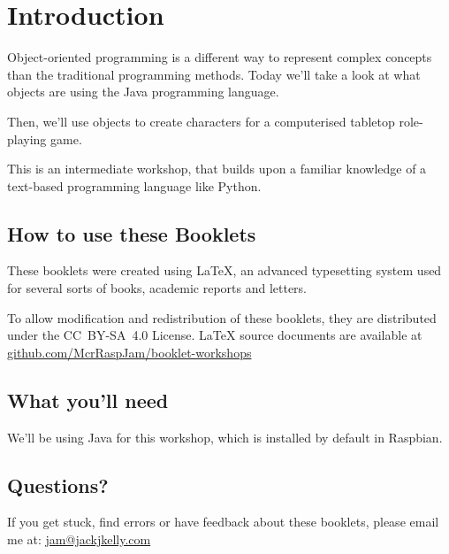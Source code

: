 \setcounter{section}{-1}
\section{Introduction}
	
	Object-oriented programming is a different way to represent complex concepts than the traditional programming methods. Today we'll take a look at what objects are using the Java programming language.
	
	Then, we'll use objects to create characters for a computerised tabletop role-playing game.

	This is an intermediate workshop, that builds upon a familiar knowledge of a text-based programming language like Python.
		
	\subsection*{How to use these Booklets}

	
	
	
	
	
		
	These booklets were created using {\selectfont \LaTeX}, an advanced typesetting system used for several sorts of books, academic reports and letters.
		
	To allow modification and redistribution of these booklets, they are distributed under the \hbox{CC BY-SA 4.0} License. LaTeX source documents are available at \mbox{\href{http://github.com/McrRaspJam/booklet-workshops}{github.com/McrRaspJam/booklet-workshops}}
	
	
	\subsection*{What you'll need}
		
		We'll be using Java for this workshop, which is installed by default in Raspbian.
		
	\subsection*{Questions?}
		If you get stuck, find errors or have feedback about these booklets, please email me at:
		\mbox{\url{jam@jackjkelly.com}\label{email}}